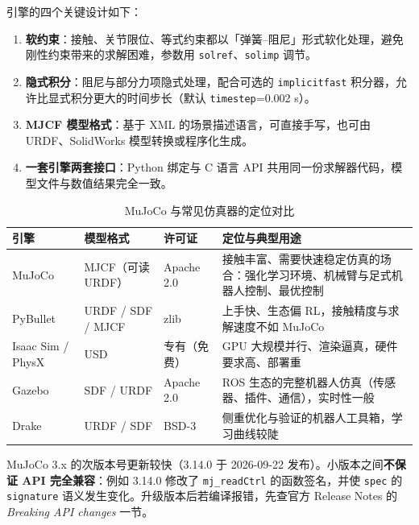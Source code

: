 引擎的四个关键设计如下：

\begin{enumerate}
	\item \textbf{软约束}：接触、关节限位、等式约束都以「弹簧--阻尼」形式软化处理，避免刚性约束带来的求解困难，参数用 \texttt{solref}、\texttt{solimp} 调节。
	\item \textbf{隐式积分}：阻尼与部分力项隐式处理，配合可选的 \texttt{implicitfast} 积分器，允许比显式积分更大的时间步长（默认 \texttt{timestep}=0.002 s）。
	\item \textbf{MJCF 模型格式}：基于 XML 的场景描述语言，可直接手写，也可由 URDF、SolidWorks 模型转换或程序化生成。
	\item \textbf{一套引擎两套接口}：Python 绑定与 C 语言 API 共用同一份求解器代码，模型文件与数值结果完全一致。
\end{enumerate}

\begin{table}[H]
	\centering
	\caption{MuJoCo 与常见仿真器的定位对比}
	\label{tab:MuJoCo:对比}
	\footnotesize
	\begin{tabular}{>{\raggedright\arraybackslash}p{2.1cm}>{\raggedright\arraybackslash}p{3.5cm}>{\raggedright\arraybackslash}p{3.2cm}>{\raggedright\arraybackslash}p{5.4cm}}
		\hline
		引擎 & 模型格式 & 许可证 & 定位与典型用途 \\
		\hline
		MuJoCo & MJCF（可读 URDF） & Apache 2.0 & 接触丰富、需要快速稳定仿真的场合：强化学习环境、机械臂与足式机器人控制、最优控制 \\
		PyBullet & URDF / SDF / MJCF & zlib & 上手快、生态偏 RL，接触精度与求解速度不如 MuJoCo \\
		Isaac Sim / PhysX & USD & 专有（免费） & GPU 大规模并行、渲染逼真，硬件要求高、部署重 \\
		Gazebo & SDF / URDF & Apache 2.0 & ROS 生态的完整机器人仿真（传感器、插件、通信），实时性一般 \\
		Drake & URDF / SDF & BSD-3 & 侧重优化与验证的机器人工具箱，学习曲线较陡 \\
		\hline
	\end{tabular}
\end{table}

\begin{tipbox}[版本与兼容性]
	MuJoCo 3.x 的次版本号更新较快（3.14.0 于 2026-09-22 发布）。小版本之间\textbf{不保证 API 完全兼容}：例如 3.14.0 修改了 \texttt{mj\_readCtrl} 的函数签名，并使 \texttt{spec} 的 \texttt{signature} 语义发生变化。升级版本后若编译报错，先查官方 Release Notes 的 \textit{Breaking API changes} 一节。
\end{tipbox}

